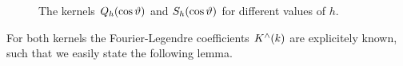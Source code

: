 \documentclass[11pt,a4paper,twoside,bibtotoc]{scrartcl}
\theoremstyle{plain}
\theoremstyle{definition}
\theoremstyle{remark}
\newcommand{\fun}[2]{\ensuremath{#1{\hspace{-0.4ex}}\left(#2\right)}}
\numberwithin{equation}{section}
\numberwithin{table}{section}
\numberwithin{figure}{section}
\begin{document}
\begin{figure}[tb]
  \centering
  \hfill
  \caption{The kernels $\fun{Q_{h}}{\cos\vartheta}$ and $\fun{S_{h}}{\cos\vartheta}$
  for different values of $h$.}
  \label{Basics:Figure:PoissonSingularityKernel}
\end{figure}

For both kernels the Fourier-Legendre coefficients $\fun{K^{\wedge}}{k}$ are
explicitely known, such that we easily state the following lemma.
\end{document}
